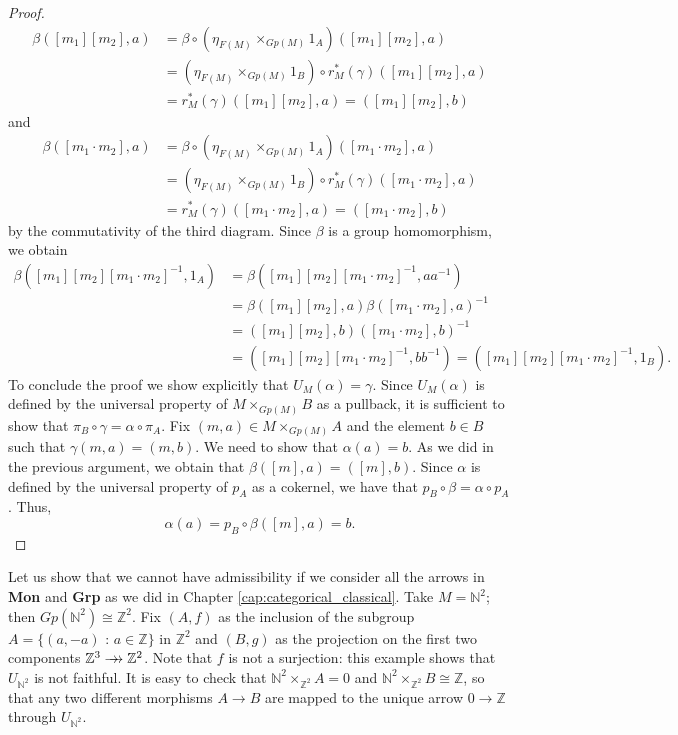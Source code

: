 \begin{lemma}
\begin{proof}
\begin{align*}
            \beta([m_1][m_2],a)&=\beta\circ( \eta_{F(M)}\times_{Gp(M)}1_A)([m_1][m_2],a)\\& = (\eta_{F(M)}\times_{Gp(M)}1_B)\circ r_M^*(\gamma)([m_1][m_2],a) \\&= r_M^*(\gamma)([m_1][m_2],a) = ([m_1][m_2],b) 
        \end{align*}
        and
        \begin{align*}
            \beta([m_1\cdot m_2],a)&=\beta\circ (\eta_{F(M)}\times_{Gp(M)}1_A)([m_1\cdot m_2],a)\\& = (\eta_{F(M)}\times_{Gp(M)}1_B)\circ r_M^*(\gamma)([m_1\cdot m_2],a)\\ &= r_M^*(\gamma)([m_1\cdot m_2],a) = ([m_1\cdot m_2],b) 
        \end{align*}
        by the commutativity of the third diagram. Since $\beta$ is a group homomorphism, we obtain
        \begin{align*}
            \beta([m_1][m_2][m_1\cdot m_2]^{-1}, 1_A) &= \beta([m_1][m_2][m_1\cdot m_2]^{-1}, aa^{-1}) \\&= \beta([m_1][m_2],a)\beta([m_1\cdot m_2], a)^{-1}\\
            & = ([m_1][m_2],b)([m_1\cdot m_2],b)^{-1} \\&= ([m_1][m_2][m_1\cdot m_2]^{-1}, bb^{-1}) = ([m_1][m_2][m_1\cdot m_2]^{-1}, 1_B).
        \end{align*}
        To conclude the proof we show explicitly that $U_M(\alpha) = \gamma$. Since $U_M(\alpha)$ is defined by the universal property of $M\times_{Gp(M)}B$ as a pullback, it is sufficient to show that $\pi_B\circ\gamma = \alpha\circ\pi_A$. Fix $(m,a)\in M\times_{Gp(M)}A$ and the element $b\in B$ such that $\gamma(m,a)=(m,b)$. We need to show that $\alpha(a)=b$. As we did in the previous argument, we obtain that $\beta([m],a) = ([m],b)$. Since $\alpha$ is defined by the universal property of $p_A$ as a cokernel, we have that $p_B\circ\beta = \alpha\circ p_A$. Thus,
        \[ \alpha(a) = p_B\circ \beta([m],a) = b. \]
    \end{proof}
\end{lemma}

\begin{example}
    Let us show that we cannot have admissibility if we consider all the arrows in \textbf{Mon} and \textbf{Grp} as we did in Chapter \ref{cap:categorical_classical}. Take $M=\mathbb{N}^2$; then $Gp(\mathbb{N}^2)\cong \mathbb{Z}^2$. Fix $(A,f)$ as the inclusion of the subgroup $A=\{(a,-a)\text{ : }a\in \mathbb{Z}\}$ in $\mathbb{Z}^2$ and $(B,g)$ as the projection on the first two components $\mathbb{Z}^3\rrightarrow\mathbb{Z}^2$. Note that $f$ is not a surjection: this example shows that $U_{\mathbb{N}^2}$ is not faithful. It is easy to check that $\mathbb{N}^2\times_{\mathbb{Z}^2}A = 0$ and $\mathbb{N}^2\times_{\mathbb{Z}^2}B \cong \mathbb{Z}$, so that any two different morphisms $A\to B$ are mapped to the unique arrow $0\to \mathbb{Z}$ through $U_{\mathbb{N}^2}$. 
\end{example}



